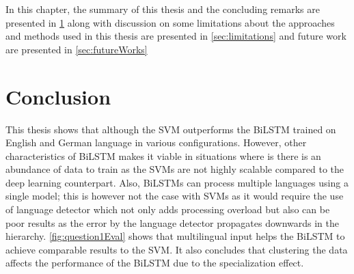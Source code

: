 \label{ch:conclusion}

In this chapter, the summary of this  thesis and the concluding remarks are presented in \ref{sec:conclusion} along with discussion on some limitations about the approaches and methods used in this thesis are presented in \ref{sec:limitations} and future work are presented in \ref{sec:futureWorks}

\section{Conclusion}\label{sec:conclusion}
This thesis shows that although the \gls{SVM} outperforms the \gls{BiLSTM} trained on English and German language in various configurations. However, other characteristics of \gls{BiLSTM} makes it viable in situations where is there is an abundance of data to train as the \glspl{SVM} are not highly scalable compared to the deep learning counterpart. Also, \glspl{BiLSTM} can process multiple languages using a single model; this is however not the case with \glspl{SVM} as it would require the use of language detector which not only adds processing overload but also can be poor results as the error by the language detector propagates downwards in the hierarchy.  \ref{fig:question1Eval} shows that multilingual input helps the \gls{BiLSTM} to achieve comparable results to the SVM. It also concludes that clustering the data affects the performance of the \gls{BiLSTM} due to the specialization effect. 


